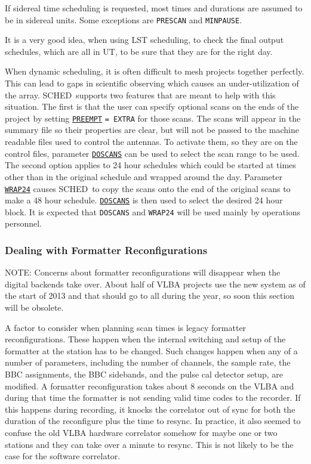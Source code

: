 \documentclass{report}
\newcommand{\schedb}{{\sc SCHED~}}
\begin{document}
If sidereal time scheduling is requested, most times and durations are
assumed to be in sidereal units.  Some exceptions are {\tt PRESCAN} and
{\tt MINPAUSE}.

It is a very good idea, when using LST scheduling, to check the
final output schedules, which are all in UT, to be sure that they
are for the right day.

When dynamic scheduling, it is often difficult to mesh projects
together perfectly.  This can lead to gaps in scientific observing
which causes an under-utilization of the array.  \schedb supports two
features that are meant to help with this situation.  The first is
that the user can specify optional scans on the ends of the project by
setting 
{\hyperref[MP:PREEMPT]{{\tt PREEMPT}}} {\tt = EXTRA} for those
scans.  The scans will appear in the summary file so their properties
are clear, but will not be passed to the machine readable files used
to control the antennas.  To activate them, so they are on the control
files, parameter 
{\hyperref[MP:DOSCANS]{{\tt DOSCANS}}} can be used to
select the scan range to be used.  The second option applies to 24
hour schedules which could be started at times other than in the
original schedule and wrapped around the day.  Parameter 
{\hyperref[MP:WRAP24]{{\tt WRAP24}}}
causes \schedb to copy the scans onto the
end of the original scans to make a 48 hour schedule.  
{\hyperref[MP:DOSCANS]{{\tt DOSCANS}}}
is then used to select the desired 24 hour
block.  It is expected that {\tt DOSCANS} and {\tt WRAP24} will be
used mainly by operations personnel.


\subsubsection{\label{SSSEC:Reconfigurations}Dealing with Formatter
Reconfigurations}

NOTE: Concerns about formatter reconfigurations will disappear when
the digital backends take over.  About half of VLBA projects use the
new system as of the start of 2013 and that should go to all during
the year, so soon this section will be obsolete.

A factor to consider when planning scan times is legacy formatter
reconfigurations.  These happen when the internal switching and setup
of the formatter at the station has to be changed.  Such changes
happen when any of a number of parameters, including the number of
channels, the sample rate, the BBC assignments, the BBC sidebands, and
the pulse cal detector setup, are modified.  A formatter
reconfiguration takes about 8 seconds on the VLBA and during that time
the formatter is not sending valid time codes to the recorder.  If
this happens during recording, it knocks the correlator out of sync
for both the duration of the reconfigure plus the time to resync.  In
practice, it also seemed to confuse the old VLBA hardware correlator
somehow for maybe one or two stations and they can take over a minute
to resync.  This is not likely to be the case for the software
correlator.
\end{document}
